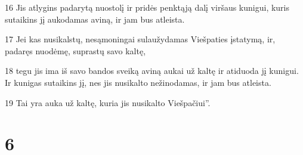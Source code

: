 \par 16 Jis atlygins padarytą nuostolį ir pridės penktąją dalį viršaus kunigui, kuris sutaikins jį aukodamas aviną, ir jam bus atleista. 
\par 17 Jei kas nusikalstų, nesąmoningai sulaužydamas Viešpaties įstatymą, ir, padaręs nuodėmę, suprastų savo kaltę, 
\par 18 tegu jis ima iš savo bandos sveiką aviną aukai už kaltę ir atiduoda jį kunigui. Ir kunigas sutaikins jį, nes jis nusikalto nežinodamas, ir jam bus atleista. 
\par 19 Tai yra auka už kaltę, kuria jis nusikalto Viešpačiui”.



\chapter{6}

